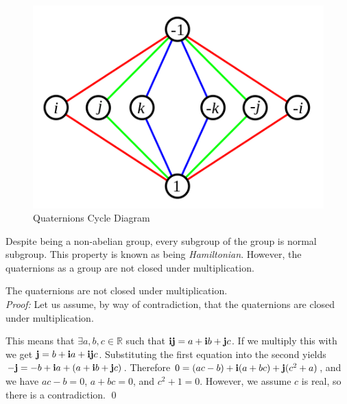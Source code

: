 \begin{figure}[H]
\centering
\includegraphics[width = .75\textwidth]{Figures/cycle.png}
\caption{Quaternions Cycle Diagram}
\label{fig:cycle}
\end{figure}
Despite being a non-abelian group, every subgroup of the group is normal subgroup.
This property is known as being \textit{Hamiltonian}.
However, the quaternions as a group are not closed under multiplication.
\begin{thm} The quaternions are not closed under multiplication.
\noindent \\ \textit{Proof:}
Let us assume, by way of contradiction, that the quaternions are closed under multiplication.

This means that $\exists a,b,c \in \mathbb{R}$ such that $\text{\textbf{i}}\text{\textbf{j}} = a + \text{\textbf{i}} b + \text{\textbf{j}} c$.
If we multiply this with \qi$ $ we get $\text{\textbf{j}} = b + \text{\textbf{i}} a + \text{\textbf{i}} \text{\textbf{j}} c$.
Substituting the first equation into the second yields $-\text{\textbf{j}} = -b + \text{\textbf{i}} a + (a + \text{\textbf{i}} b + \text{\textbf{j}} c)$.
Therefore $0 = (ac - b) + \text{\textbf{i}}(a + bc) + \text{\textbf{j}}(c^2 + a)$, and we have $ac-b = 0$, $a+bc=0$, and $c^2 + 1 = 0$.
However, we assume $c$ is real, so there is a contradiction. \qed

\end{thm}

